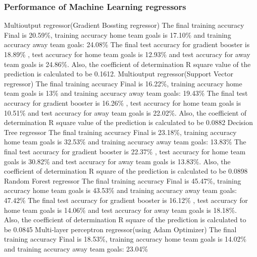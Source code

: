 \subsubsection{Performance of Machine Learning regressors}
Multioutput regressor(Gradient Bossting regressor)\newline
The final training accuracy Final is 20.59\%, training accuracy home team goals is 17.10\% and training accuracy away team goals: 24.08\% \newline
The final test accuracy for gradient booster is 18.89\% , test accuracy for home team goals is 12.93\% and test accuracy for away team goals is 24.86\%. Also, the coefficient of determination R square value of the prediction is calculated to be 0.1612.\newline
Multioutput regressor(Support Vector regressor)\newline
The final training accuracy Final is 16.22\%, training accuracy home team goals is 13\% and training accuracy away team goals: 19.43\% \newline
The final test accuracy for gradient booster is 16.26\% , test accuracy for home team goals is 10.51\% and test accuracy for away team goals is 22.02\%. Also, the coefficient of determination R square value of the prediction is calculated to be 0.0882 \newline
Decision Tree regressor\newline
The final training accuracy Final is 23.18\%, training accuracy home team goals is 32.53\% and training accuracy away team goals: 13.83\% \newline
The final test accuracy for gradient booster is 22.37\% , test accuracy for home team goals is 30.82\% and test accuracy for away team goals is 13.83\%. Also, the coefficient of determination R square of the prediction is calculated to be 0.0898\newline 
Random Forest regressor\newline
The final training accuracy Final is 45.47\%, training accuracy home team goals is 43.53\% and training accuracy away team goals: 47.42\% \newline
The final test accuracy for gradient booster is 16.12\% , test accuracy for home team goals is 14.06\% and test accuracy for away team goals is 18.18\%. Also, the coefficient of determination R square of the prediction is calculated to be 0.0845 \newline 
Multi-layer perceptron regressor(using Adam Optimizer)\newline
The final training accuracy Final is 18.53\%, training accuracy home team goals is 14.02\% and training accuracy away team goals: 23.04\% \newline
